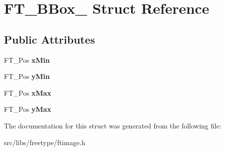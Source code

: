 \hypertarget{struct_f_t___b_box__}{
\section{FT\_\-BBox\_\- Struct Reference}
\label{struct_f_t___b_box__}
}
\subsection*{Public Attributes}
\begin{DoxyCompactItemize}
\item 
\hypertarget{struct_f_t___b_box___a1f2a5d0565d496c1d41e43d018f45add}{
FT\_\-Pos {\bfseries xMin}}
\label{struct_f_t___b_box___a1f2a5d0565d496c1d41e43d018f45add}

\item 
\hypertarget{struct_f_t___b_box___a959ca1d5bc1c5338da0d85c8e7135f4e}{
FT\_\-Pos {\bfseries yMin}}
\label{struct_f_t___b_box___a959ca1d5bc1c5338da0d85c8e7135f4e}

\item 
\hypertarget{struct_f_t___b_box___ac6da5c44f4cb7b97eef1f438eb69c0ec}{
FT\_\-Pos {\bfseries xMax}}
\label{struct_f_t___b_box___ac6da5c44f4cb7b97eef1f438eb69c0ec}

\item 
\hypertarget{struct_f_t___b_box___a77084921589f386a8a593ae1f25b1569}{
FT\_\-Pos {\bfseries yMax}}
\label{struct_f_t___b_box___a77084921589f386a8a593ae1f25b1569}

\end{DoxyCompactItemize}


The documentation for this struct was generated from the following file:\begin{DoxyCompactItemize}
\item 
src/libs/freetype/ftimage.h\end{DoxyCompactItemize}
